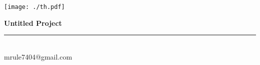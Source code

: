 \documentclass[11pt]{article}
\newcommand{\HRule}{\rule{\linewidth}{0.5mm}}
\begin{document}
\thispagestyle{empty}
\begin{minipage}{0.12\textwidth}
\texttt{[image: ./th.pdf]}
\end{minipage}\hspace{1em}
\begin{minipage}{0.2\textwidth}
\end{minipage}
\begin{minipage}{0.8\textwidth}
{\Huge \bfseries Untitled Project}\\
\HRule\\
\Large mrule7404@gmail.com
\end{minipage}
\end{document}
